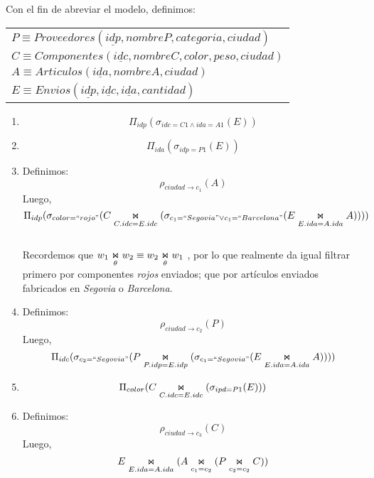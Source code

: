 Con el fin de abreviar el modelo, definimos:
	\begin{center}
		\begin{tabular}{l}
			$P \equiv Proveedores(\underline{idp}, nombreP, categoria, ciudad)$\\
			$C \equiv Componentes(\underline{idc}, nombreC, color, peso, ciudad)$\\
			$A \equiv Articulos(\underline{ida}, nombreA, ciudad)$\\
			$E \equiv Envios(\underline{idp}, \underline{idc}, \underline{ida}, cantidad)$\\
		\end{tabular}
	\end{center}
	\begin{enumerate}
		\item 
		$$\Pi_{idp}(\sigma_{idc = C1 \wedge ida = A1}(E))$$
		
		\item 
		$$\Pi_{ida}(\sigma_{idp = P1}(E))$$
		
		\item Definimos:
		$$\rho_{ciudad\rightarrow c_1}(A)$$
		Luego,
		$$\Pi_{idp}(\sigma_{color=``rojo"}(C\innerjoin[C.idc = E.idc](\sigma_{c_1 = ``Segovia" \vee c_1 = ``Barcelona"}(E \innerjoin[E.ida = A.ida] A))))$$\\[0.25cm]
		Recordemos que $w_1 \innerjoin w_2 \equiv w_2 \innerjoin w_1$ , por lo que realmente da igual filtrar primero por %
		componentes \textit{rojos} enviados; que por artículos enviados fabricados en \textit{Segovia} o \textit{Barcelona}.
		
		\item Definimos:
		$$\rho_{ciudad\rightarrow c_2}(P)$$
		Luego,
		$$\Pi_{idc}(\sigma_{c_2 = ``Segovia"} (P \innerjoin[P.idp = E.idp] (\sigma_{c_1 = ``Segovia"} (E \innerjoin[E.ida = A.ida] A))))$$
		
		\item $$\Pi_{color}(C\innerjoin[C.idc = E.idc](\sigma_{ipd = P1}(E)))$$
		
		\item Definimos:
		$$\rho_{ciudad\rightarrow c_3}(C)$$
		Luego,
		$$E\innerjoin[E.ida = A.ida] (A\innerjoin[c_1 = c_2](P\innerjoin[c_2 = c_2]C))$$
	\end{enumerate}